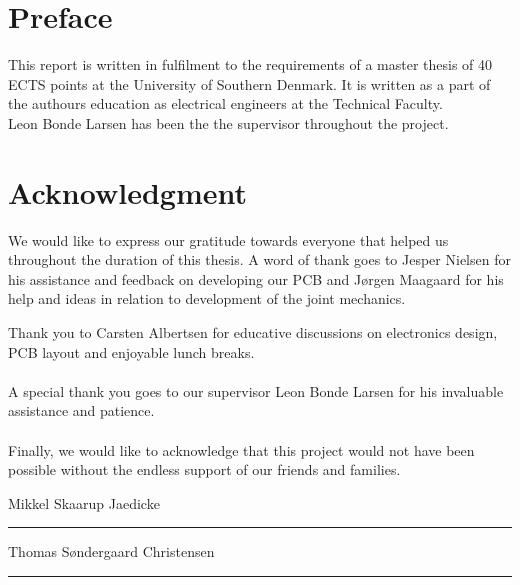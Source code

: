 
\section*{Preface}
This report is written in fulfilment to the requirements of a master thesis of 40 ECTS points at the University of Southern Denmark.
It is written as a part of the authours education as electrical engineers at the Technical Faculty.
\\
Leon Bonde Larsen has been the the supervisor throughout the project.

\section*{Acknowledgment}

We would like to express our gratitude towards everyone that helped us throughout the duration of this thesis.
A word of thank goes to Jesper Nielsen for his assistance and feedback on developing our PCB and Jørgen Maagaard for his help and ideas in relation to development of the joint mechanics. 

Thank you to Carsten Albertsen for educative discussions on electronics design, PCB layout and enjoyable lunch breaks. 
\\~\\
A special thank you goes to our supervisor Leon Bonde Larsen for his invaluable assistance and patience.
\\~\\
Finally, we would like to acknowledge that this project would not have been possible without the endless support of our friends and families.


\vspace{0.5cm}
\begin{center}
	\begin{minipage}[t]{.49\textwidth}\large
		\begin{center}
		Mikkel Skaarup Jaedicke\\
		\vspace{1cm}
		\hrule
		\vspace{0.5cm}
		Thomas Søndergaard Christensen
		\vspace{1cm}
		\hrule
		\end{center} 
	\end{minipage}
\end{center}

